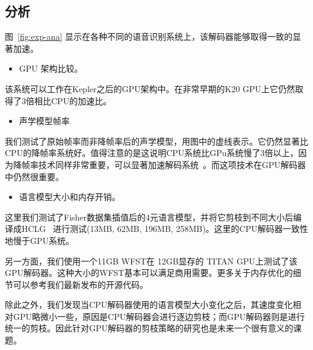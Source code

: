 \vspace{-0.25em}
\subsection{分析}
\vspace{-0.25em}
\label{sec:exp-ana}

图~\ref{fig:exp-ana} 显示在各种不同的语音识别系统上，该解码器能够取得一致的显著加速。

\begin{itemize} 
   \item GPU 架构比较。
 \end{itemize} 
 该系统可以工作在Kepler之后的GPU架构中。在非常早期的K20 GPU上它仍然取得了3倍相比CPU的加速比。
 \begin{itemize} 
   \item 声学模型帧率
 \end{itemize} 
 我们测试了原始帧率而非降帧率后的声学模型，用图中的虚线表示。它仍然显著比CPU的降帧率系统好。值得注意的是这说明CPU系统比GPu系统慢了3倍以上，因为降帧率技术同样非常重要，可以显著加速解码系统~\cite{pundak2016lower,zhc00-chen-tasl2017}。而这项技术在GPU解码器中仍然很重要。
\begin{itemize}
   \item 语言模型大小和内存开销。
 \end{itemize} 
 这里我们测试了Fisher数据集插值后的4元语言模型，并将它剪枝到不同大小后编译成HCLG~\cite{mohri2002weighted} 进行测试(13MB, 62MB, 196MB, 258MB)。这里的CPU解码器一致性地慢于GPU系统。

 另一方面，我们使用一个11GB WFST在 12GB显存的 TITAN GPU上测试了该GPU解码器。这种大小的WFST基本可以满足商用需要。更多关于内存优化的细节可以参考我们最新发布的开源代码。

 除此之外，我们发现当CPU解码器使用的语言模型大小变化之后，其速度变化相对GPU略微小一些，原因是CPU解码器会进行逐边剪枝；而GPU解码器则是进行统一的剪枝。因此针对GPU解码器的剪枝策略的研究也是未来一个很有意义的课题。








